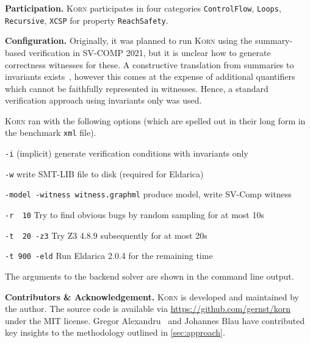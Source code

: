 \documentclass{llncs}
\newcommand{\Korn}{\textsc{Korn}\xspace}
\begin{document}
\textbf{Participation.} \Korn participates in four categories
\texttt{ControlFlow},
\texttt{Loops},
\texttt{Recursive},
\texttt{XCSP}
for property \texttt{ReachSafety}.

\textbf{Configuration.}
Originally, it was planned to run \Korn using the summary-based verification in SV-COMP 2021,
but it is unclear how to generate correctness witnesses for these.
A constructive translation from summaries to invariants exists~\cite[Prop. 1]{ernst:arxiv2020:summaries},
however this comes at the expense of additional quantifiers which cannot be faithfully represented in witnesses.
Hence, a standard verification approach using invariants only was used.

\Korn ran with the following options
(which are spelled out in their long form in the benchmark \texttt{xml} file).

\texttt{-i} (implicit)
    \tabto{2.8cm} generate verification conditions with invariants only

\texttt{-w}
    \tabto{2.8cm} write SMT-LIB file to disk (required for Eldarica)

\smallskip

\texttt{-model -witness witness.graphml}
    produce model, write SV-Comp witness

\smallskip

\texttt{-r~~10}
    \tabto{2.8cm} Try to find obvious bugs by random sampling for at most 10s

\texttt{-t~~20 -z3}
    \tabto{2.8cm} Try Z3 4.8.9 subsequently for at most 20s

\texttt{-t~900 -eld}
    \tabto{2.8cm} Run Eldarica 2.0.4 for the remaining time

\smallskip

\noindent
The arguments to the backend solver are shown in the command line output.

\textbf{Contributors \& Acknowledgement.}
\Korn is developed and maintained by the author.
The source code is available via \url{https://github.com/gernst/korn} under the MIT license.
Gregor Alexandru~\cite{alexandru2019} and Johannes Blau have contributed
key insights to the methodology outlined in \cref{sec:approach}.



\end{document}
